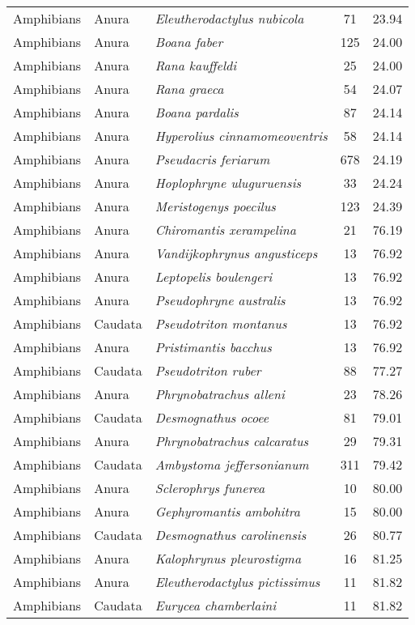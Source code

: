 \begin{longtable}{ll>{\itshape}lcc}
  Amphibians & Anura & Eleutherodactylus nubicola &  71 & 23.94 \\ 
  Amphibians & Anura & Boana faber & 125 & 24.00 \\ 
  Amphibians & Anura & Rana kauffeldi &  25 & 24.00 \\ 
  Amphibians & Anura & Rana graeca &  54 & 24.07 \\ 
  Amphibians & Anura & Boana pardalis &  87 & 24.14 \\ 
  Amphibians & Anura & Hyperolius cinnamomeoventris &  58 & 24.14 \\ 
  Amphibians & Anura & Pseudacris feriarum & 678 & 24.19 \\ 
  Amphibians & Anura & Hoplophryne uluguruensis &  33 & 24.24 \\ 
  Amphibians & Anura & Meristogenys poecilus & 123 & 24.39 \\ 
  Amphibians & Anura & Chiromantis xerampelina &  21 & 76.19 \\ 
  Amphibians & Anura & Vandijkophrynus angusticeps &  13 & 76.92 \\ 
  Amphibians & Anura & Leptopelis boulengeri &  13 & 76.92 \\ 
  Amphibians & Anura & Pseudophryne australis &  13 & 76.92 \\ 
  Amphibians & Caudata & Pseudotriton montanus &  13 & 76.92 \\ 
  Amphibians & Anura & Pristimantis bacchus &  13 & 76.92 \\ 
  Amphibians & Caudata & Pseudotriton ruber &  88 & 77.27 \\ 
  Amphibians & Anura & Phrynobatrachus alleni &  23 & 78.26 \\ 
  Amphibians & Caudata & Desmognathus ocoee &  81 & 79.01 \\ 
  Amphibians & Anura & Phrynobatrachus calcaratus &  29 & 79.31 \\ 
  Amphibians & Caudata & Ambystoma jeffersonianum & 311 & 79.42 \\ 
  Amphibians & Anura & Sclerophrys funerea &  10 & 80.00 \\ 
  Amphibians & Anura & Gephyromantis ambohitra &  15 & 80.00 \\ 
  Amphibians & Caudata & Desmognathus carolinensis &  26 & 80.77 \\ 
  Amphibians & Anura & Kalophrynus pleurostigma &  16 & 81.25 \\ 
  Amphibians & Anura & Eleutherodactylus pictissimus &  11 & 81.82 \\ 
  Amphibians & Caudata & Eurycea chamberlaini &  11 & 81.82 \\ 

\end{longtable}
